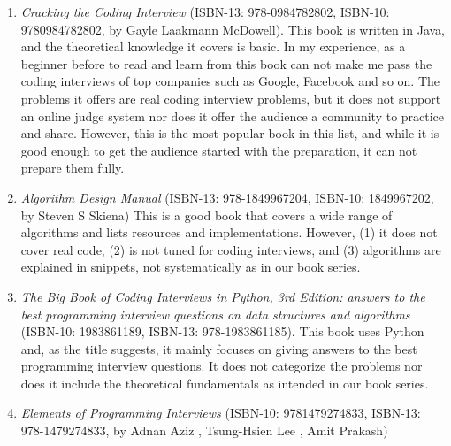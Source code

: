\documentclass[12pt]{article}
\begin{document}
\begin{enumerate}
    \item \textit{Cracking the Coding Interview} (ISBN-13: 978-0984782802, ISBN-10: 9780984782802, by Gayle Laakmann McDowell). This book is written in Java, and the theoretical knowledge it covers is basic. In my experience, as a beginner before to read and learn from this book can not make me pass the coding interviews of top companies such as Google, Facebook and so on. The problems it offers are real coding interview problems, but it does not support an online judge system nor does it offer the audience a community to practice and share. However, this is the most popular book in this list, and while it is good enough to get the audience started with the preparation, it can not prepare them fully. 
    
    \item \textit{Algorithm Design Manual} (ISBN-13: 978-1849967204, ISBN-10: 1849967202, by Steven S Skiena) This is a good book that covers a wide range of algorithms and lists resources and implementations. However,  (1) it does not cover real code, (2) is not tuned for coding interviews, and (3) algorithms are explained in snippets, not systematically as in our book series. 
    
    \item \textit{The Big Book of Coding Interviews in Python, 3rd Edition: answers to the best programming interview questions on data structures and algorithms} (ISBN-10: 1983861189, ISBN-13: 978-1983861185). This book uses Python and, as the title suggests, it mainly focuses on giving answers to the best programming interview questions. It does not categorize the problems nor does it include the theoretical fundamentals as intended in our book series.
    
    \item \textit{Elements of Programming Interviews} (ISBN-10: 9781479274833, ISBN-13: 978-1479274833, by Adnan Aziz , Tsung-Hsien Lee , Amit Prakash)
\end{enumerate}
\end{document}
